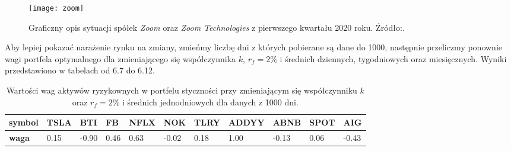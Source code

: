 \documentclass[magister]{dyplom}
\begin{document}
\begin{figure}[ht]
	\centering
	\texttt{[image: zoom]}
	\caption{Graficzny opis sytuacji spółek \textit{Zoom} oraz \textit{Zoom Technologies} z pierwszego kwartału 2020 roku. Źródło:\cite{zoominvest}.}
\end{figure}
\newpage
Aby lepiej pokazać narażenie rynku na zmiany, zmieńmy liczbę dni z których pobierane są dane do 1000, następnie przeliczmy ponownie wagi portfela optymalnego dla zmieniającego się współczynnika $k$, $r_f = 2\%$ i średnich dziennych, tygodniowych oraz miesięcznych. Wyniki przedstawiono w tabelach od 6.7 do 6.12.
\begin{table}[ht]
	\centering
	\caption{Wartości wag aktywów ryzykownych w portfelu styczności przy zmieniającym się współczynniku $k$ oraz $r_f = 2\%$ i średnich jednodniowych dla danych z 1000 dni.}
	\begin{tabular}{|l|l|l|l|l|l|l|l|l|l|l|}
		\hline
		\textbf{symbol} & \textbf{TSLA} & \textbf{BTI} & \textbf{FB} & \textbf{NFLX} & \textbf{NOK} & \textbf{TLRY} & \textbf{ADDYY} & \textbf{ABNB} & \textbf{SPOT} & \textbf{AIG} \\ \hline
		\textbf{waga}   & 0.15       & -0.90          & 0.46           & 0.63        & -0.02         & 0.18         & 1.00        & -0.13          & 0.06          & -0.43        \\ \hline
	\end{tabular}
\end{table}
\end{document}
